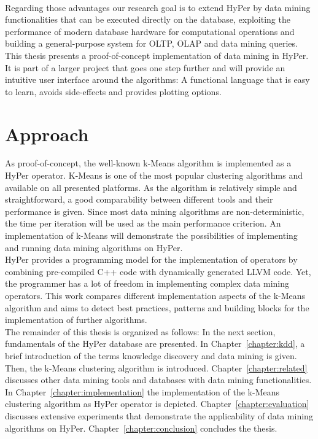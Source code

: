 \\
Regarding those advantages our research goal is to extend HyPer by data mining functionalities that can be executed directly on the database, exploiting the performance of modern database hardware for computational operations and building a general-purpose system for OLTP, OLAP and data mining queries. This thesis presents a proof-of-concept implementation of data mining in HyPer. It is part of a larger project that goes one step further and will provide an intuitive user interface around the algorithms: A functional language that is easy to learn, avoids side-effects and provides plotting options. 


\section{Approach}
As proof-of-concept, the well-known k-Means algorithm is implemented as a HyPer operator. K-Means is one of the most popular  clustering algorithms and available on all presented platforms. As the algorithm is relatively simple and straightforward, a good comparability between different tools and their performance is given. Since most data mining algorithms are non-deterministic, the time per iteration will be used as the main performance criterion. An implementation of k-Means will demonstrate the possibilities of implementing and running data mining algorithms on HyPer.
\\
HyPer provides a programming model for the implementation of operators by combining pre-compiled C++ code with dynamically generated LLVM code. Yet, the programmer has a lot of freedom in implementing complex data mining operators. This work compares different implementation aspects of the k-Means algorithm and aims to detect best practices, patterns and building blocks for the implementation of further algorithms.
\\
The remainder of this thesis is organized as follows: In the next section, fundamentals of the HyPer database are presented. In Chapter~\ref{chapter:kdd}, a brief introduction of the terms knowledge discovery and data mining is given. Then, the k-Means clustering algorithm is introduced. Chapter~\ref{chapter:related} discusses other data mining tools and databases with data mining functionalities. In Chapter~\ref{chapter:implementation} the implementation of the k-Means clustering algorithm as HyPer operator is depicted. Chapter~\ref{chapter:evaluation} discusses extensive experiments that demonstrate the applicability of data mining algorithms on HyPer. Chapter~\ref{chapter:conclusion} concludes the thesis.




